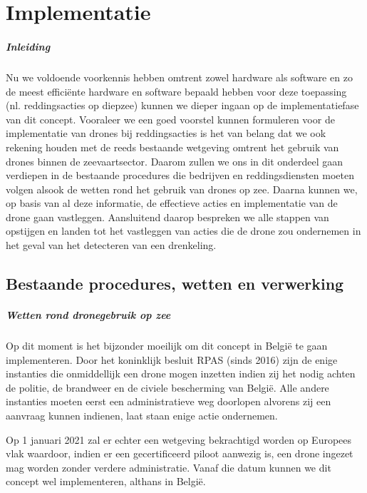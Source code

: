 \chapter{Implementatie}
\label{ch:implementatie}

\paragraph{Inleiding}

Nu we voldoende voorkennis hebben omtrent zowel hardware als software en zo de meest efficiënte hardware en software bepaald hebben voor deze toepassing (nl. reddingsacties op diepzee) kunnen we dieper ingaan op de implementatiefase van dit concept. Vooraleer we een goed voorstel kunnen formuleren voor de implementatie van drones bij reddingsacties is het van belang dat we ook rekening houden met de reeds bestaande wetgeving omtrent het gebruik van drones binnen de zeevaartsector. Daarom zullen we ons in dit onderdeel gaan verdiepen in de bestaande procedures die bedrijven en reddingsdiensten moeten volgen alsook de wetten rond het gebruik van drones op zee. Daarna kunnen we, op basis van al deze informatie, de effectieve acties en implementatie van de drone gaan vastleggen. Aansluitend daarop bespreken we alle stappen van opstijgen en landen tot het vastleggen van acties die de drone zou ondernemen in het geval van het detecteren van een drenkeling. 

\section{Bestaande procedures, wetten en verwerking}

\paragraph{Wetten rond dronegebruik op zee}

Op dit moment is het bijzonder moeilijk om dit concept in België te gaan implementeren. Door het koninklijk besluit RPAS (sinds 2016) zijn de enige instanties die onmiddellijk een drone mogen inzetten indien zij het nodig achten de politie, de brandweer en de civiele bescherming van België. Alle andere instanties moeten eerst een administratieve weg doorlopen alvorens zij een aanvraag kunnen indienen, laat staan enige actie ondernemen. 

Op 1 januari 2021 zal er echter een wetgeving bekrachtigd worden op Europees vlak waardoor, indien er een gecertificeerd piloot aanwezig is, een drone ingezet mag worden zonder verdere administratie. Vanaf die datum kunnen we dit concept wel implementeren, althans in België. 

